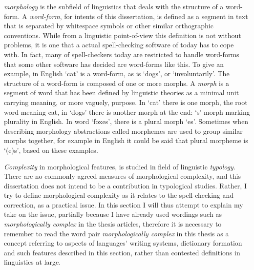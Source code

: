 \documentclass[officiallayout,final]{unihelcompling}
\begin{document}
\emph{\Gls{morphology}} is the subfield of linguistics that deals with the
structure of a word-form. A \emph{\gls{word-form}}, for intents of this
dissertation, is defined as a segment in text that is separated by whitespace
symbols or other similar orthographic conventions. While from a linguistic
point-of-view this definition is not without problems, it is one that a actual
spell-checking software of today has to cope with. In fact, many of
spell-checkers today are restricted to handle word-forms that some other
software has decided are word-forms like this. To give an example, in English
`cat' is a word-form, as is `dogs', or `involuntarily'. The structure of a
word-form is composed of one or more morphs. A \emph{\gls{morph}} is a segment
of word that has been defined by linguistic theories as a minimal unit carrying
meaning, or more vaguely, purpose. In `cat' there is one morph, the root word
meaning cat, in `dogs' there is another morph at the end: `s' morph marking
plurality in English. In word `foxes', there is a plural morph `es'. Sometimes
when describing morphology abstractions called \glspl{morpheme} are used to
group similar morphs together, for example in English it could be said that
plural morpheme is `(e)s', based on these examples.

\emph{Complexity} in morphological features, is studied in field of linguistic
\emph{typology}. There are no commonly agreed measures of morphological
complexity, and this dissertation does not intend to be a contribution in
typological studies. Rather, I try to define morphological complexity as it
relates to the spell-checking and correction, as a practical issue. In this
section I will thus attempt to explain my take on the issue, partially because
I have already used wordings such as \emph{morphologically complex} in the
thesis articles, therefore it is necessary to remember to read the word pair
\emph{morphologically complex} in this thesis as a concept referring to aspects
of languages' writing systems, dictionary formation and such features described
in this section, rather than contested definitions in linguistics at large.
\end{document}
